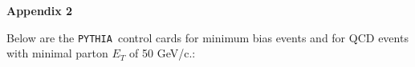\documentclass{cmspaper}
\def\pythia {\texttt{PYTHIA }}
\begin{document}


\clearpage
{\Large \bf Appendix 2}


Below are the  \pythia control cards for minimum bias events and for QCD events with minimal  parton $E_T$ of 50 GeV/c.:
\end{document}
